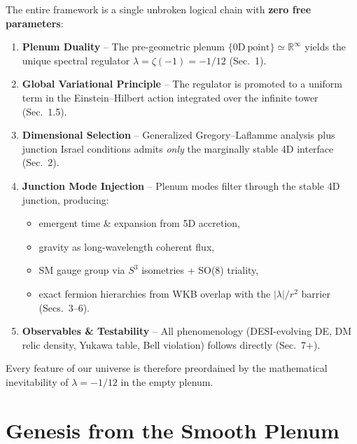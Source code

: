\documentclass[11pt,a4paper,oneside]{article}
\begin{document}
\begin{tcolorbox}[
  colback=blue!5!white,
  colframe=blue!70!black,
  title={\bfseries Derivation Roadmap},
  fonttitle=\large\bfseries,
  boxrule=1.2pt,
  arc=4pt,
  left=9pt, right=9pt, top=9pt, bottom=9pt,
  coltitle=white
]
The entire framework is a single unbroken logical chain with \textbf{zero free parameters}:

\begin{enumerate}
\item \textbf{Plenum Duality} -- The pre-geometric plenum $\{0\mathrm{D\ point}\} \simeq \mathbb{R}^\infty$ yields the unique spectral regulator $\lambda = \zeta(-1) = -1/12$ (Sec.~1).

\item \textbf{Global Variational Principle} -- The regulator is promoted to a uniform term in the Einstein--Hilbert action integrated over the infinite tower (Sec.~1.5).

\item \textbf{Dimensional Selection} -- Generalized Gregory--Laflamme analysis plus junction Israel conditions admits \emph{only} the marginally stable 4D interface (Sec.~2).

\item \textbf{Junction Mode Injection} -- Plenum modes filter through the stable 4D junction, producing:
   \begin{itemize}
   \item emergent time \& expansion from 5D accretion,
   \item gravity as long-wavelength coherent flux,
   \item SM gauge group via $S^3$ isometries + SO(8) triality,
   \item exact fermion hierarchies from WKB overlap with the $|\lambda|/r^2$ barrier (Secs.~3--6).
   \end{itemize}

\item \textbf{Observables \& Testability} -- All phenomenology (DESI-evolving DE, DM relic density, Yukawa table, Bell violation) follows directly (Sec.~7+).
\end{enumerate}

Every feature of our universe is therefore preordained by the mathematical inevitability of $\lambda=-1/12$ in the empty plenum.
\end{tcolorbox}

\bigskip

\section{Genesis from the Smooth Plenum}
\end{document}
